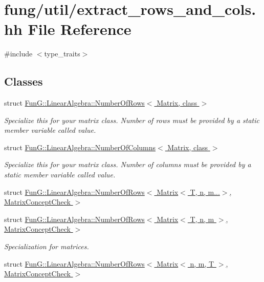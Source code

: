 \hypertarget{extract__rows__and__cols_8hh}{\section{fung/util/extract\-\_\-rows\-\_\-and\-\_\-cols.hh \-File \-Reference}
\label{extract__rows__and__cols_8hh}
}
{\ttfamily \#include $<$type\-\_\-traits$>$}\*
\subsection*{\-Classes}
\begin{DoxyCompactItemize}
\item 
struct \hyperlink{structFunG_1_1LinearAlgebra_1_1NumberOfRows}{\-Fun\-G\-::\-Linear\-Algebra\-::\-Number\-Of\-Rows$<$ Matrix, class $>$}
\begin{DoxyCompactList}\small\item\em \-Specialize this for your matrix class. \-Number of rows must be provided by a static member variable called value. \end{DoxyCompactList}\item 
struct \hyperlink{structFunG_1_1LinearAlgebra_1_1NumberOfColumns}{\-Fun\-G\-::\-Linear\-Algebra\-::\-Number\-Of\-Columns$<$ Matrix, class $>$}
\begin{DoxyCompactList}\small\item\em \-Specialize this for your matrix class. \-Number of columns must be provided by a static member variable called value. \end{DoxyCompactList}\item 
struct \hyperlink{structFunG_1_1LinearAlgebra_1_1NumberOfRows_3_01Matrix_3_01T_00_01n_00_01m_8_8_8_4_00_01MatrixConceptCheck_01_4}{\-Fun\-G\-::\-Linear\-Algebra\-::\-Number\-Of\-Rows$<$ Matrix$<$ T, n, m...$>$, Matrix\-Concept\-Check $>$}
\item 
struct \hyperlink{structFunG_1_1LinearAlgebra_1_1NumberOfRows_3_01Matrix_3_01T_00_01n_00_01m_01_4_00_01MatrixConceptCheck_01_4}{\-Fun\-G\-::\-Linear\-Algebra\-::\-Number\-Of\-Rows$<$ Matrix$<$ T, n, m $>$, Matrix\-Concept\-Check $>$}
\begin{DoxyCompactList}\small\item\em \-Specialization for matrices. \end{DoxyCompactList}\item 
struct \hyperlink{structFunG_1_1LinearAlgebra_1_1NumberOfRows_3_01Matrix_3_01n_00_01m_00_01T_01_4_00_01MatrixConceptCheck_01_4}{\-Fun\-G\-::\-Linear\-Algebra\-::\-Number\-Of\-Rows$<$ Matrix$<$ n, m, T $>$, Matrix\-Concept\-Check $>$}

\end{DoxyCompactItemize}
